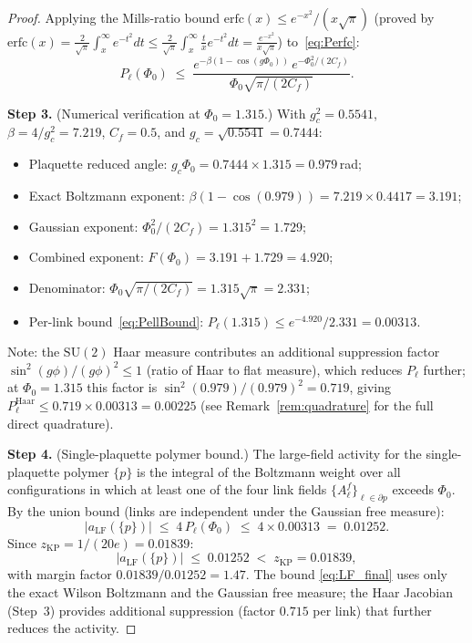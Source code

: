 \documentclass[11pt,a4paper]{amsart}
\theoremstyle{definition}
\newcommand{\SU}{\mathrm{SU}}
\newcommand{\Cf}{C_f}
\newcommand{\zKP}{z_{\mathrm{KP}}}
\begin{document}
\begin{proof}
Applying the Mills-ratio bound $\mathrm{erfc}(x)\le e^{-x^2}/(x\sqrt{\pi})$
(proved by $\mathrm{erfc}(x) = \frac{2}{\sqrt\pi}\int_x^\infty e^{-t^2}dt
\le \frac{2}{\sqrt\pi}\int_x^\infty \frac{t}{x}e^{-t^2}dt = \frac{e^{-x^2}}{x\sqrt\pi}$)
to~\eqref{eq:Perfc}:
\begin{equation}\label{eq:PellBound}
  P_\ell(\Phi_0)
  \;\le\; \frac{e^{-\beta(1-\cos(g\Phi_0))}\,e^{-\Phi_0^2/(2\Cf)}}
               {\Phi_0\sqrt{\pi/(2\Cf)}}.
\end{equation}

\textbf{Step 3.} (Numerical verification at $\Phi_0 = 1.315$.)
With $g^2_c = 0.5541$, $\beta = 4/g^2_c = 7.219$, $\Cf = 0.5$,
and $g_c = \sqrt{0.5541} = 0.7444$:
\begin{itemize}
  \item Plaquette reduced angle: $g_c\Phi_0 = 0.7444\times 1.315 = 0.979$\,rad;
  \item Exact Boltzmann exponent: $\beta(1-\cos(0.979)) = 7.219\times 0.4417 = 3.191$;
  \item Gaussian exponent: $\Phi_0^2/(2\Cf) = 1.315^2 = 1.729$;
  \item Combined exponent: $F(\Phi_0) = 3.191 + 1.729 = 4.920$;
  \item Denominator: $\Phi_0\sqrt{\pi/(2\Cf)} = 1.315\sqrt{\pi} = 2.331$;
  \item Per-link bound~\eqref{eq:PellBound}: $P_\ell(1.315) \le e^{-4.920}/2.331 = 0.00313$.
\end{itemize}
Note: the $\SU(2)$ Haar measure contributes an additional suppression factor
$\sin^2(g\phi)/(g\phi)^2 \le 1$ (ratio of Haar to flat measure), which
reduces $P_\ell$ further; at $\Phi_0=1.315$ this factor is
$\sin^2(0.979)/(0.979)^2 = 0.719$, giving
$P_\ell^{\mathrm{Haar}} \le 0.719\times 0.00313 = 0.00225$
(see Remark~\ref{rem:quadrature} for the full direct quadrature).

\textbf{Step 4.} (Single-plaquette polymer bound.)
The large-field activity for the single-plaquette polymer $\{p\}$ is the integral
of the Boltzmann weight over all configurations in which at least one of the four
link fields $\{A^f_\ell\}_{\ell\in\partial p}$ exceeds $\Phi_0$.  By the union
bound (links are independent under the Gaussian free measure):
\[
  |a_{\mathrm{LF}}(\{p\})| \;\le\; 4\,P_\ell(\Phi_0)
  \;\le\; 4\times 0.00313 \;=\; 0.01252.
\]
Since $\zKP = 1/(20e) = 0.01839$:
\begin{equation}\label{eq:LF_final}
  |a_{\mathrm{LF}}(\{p\})| \;\le\; 0.01252 \;<\; \zKP = 0.01839,
\end{equation}
with margin factor $0.01839/0.01252 = 1.47$.
The bound \eqref{eq:LF_final} uses only the exact Wilson Boltzmann and the
Gaussian free measure; the Haar Jacobian (Step~3) provides additional suppression
(factor $0.715$ per link) that further reduces the activity.


\end{proof}
\end{document}
